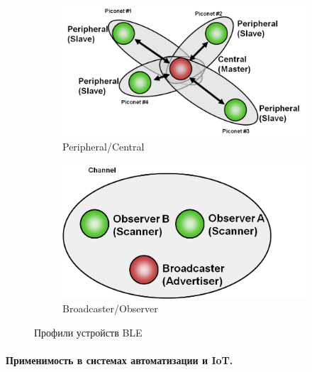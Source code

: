 \documentclass[14pt,a4paper]{extarticle}
\begin{document}
\begin{figure}[htbp]
  \centering
    \begin{subfigure}[t]{0.45\textwidth}
    \centering
    \includegraphics[width=\linewidth]{images/BLE-topology-unicast.png}
    \caption{Peripheral/Central}
    \label{fig:fig_BLE_topology_unicast}
  \end{subfigure}
  \begin{subfigure}[t]{0.45\textwidth}
    \centering
    \includegraphics[width=\linewidth]{images/BLE-topology-broadcast.png}
    \caption{Broadcaster/Observer}
    \label{fig:fig_BLE_topology_broadcast}
  \end{subfigure}\hfill
  \caption{Профили устройств BLE\cite{IMG_BLE_topologies}}
  \label{fig:twophotos}
\end{figure}



\paragraph{Применимость в системах автоматизации и IoT.}
\end{document}
